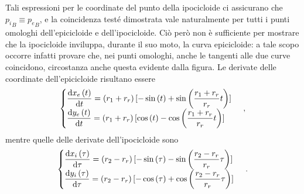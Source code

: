Tali espressioni per le coordinate del punto della ipocicloide
ci assicurano che
${p_i}_{\scriptscriptstyle B}\equiv{p_e}_{\scriptscriptstyle B}$,
e la coincidenza test\'e dimostrata vale naturalmente per tutti i punti
omologhi dell'epicicloide e dell'ipocicloide.
Ci\`o per\`o non \`e sufficiente per mostrare che la ipocicloide inviluppa,
durante il suo moto, la curva epicicloide:
a tale scopo occorre infatti provare che, nei punti omologhi,
anche le tangenti alle due curve coincidono, circostanza anche
questa evidente dalla figura. Le  derivate delle coordinate dell'epicicloide
risultano essere
\begin{equation}
\begin{cases}
\dfrac{{\rm d}{x_e}\left(t\right)}{{\rm d}t} = 
\left(r_1+r_r\right)
[-\sin\left(t\right) +
\sin\left(\dfrac{r_1+r_r}{r_r}t\right)] \\
\dfrac{{\rm d}{y_e}\left(t\right)}{{\rm d}t} = 
\left(r_1+r_r\right)
[\cos\left(t\right) -
\cos\left(\dfrac{r_1+r_r}{r_r}t\right)]
\end{cases}\,,
\label{eq:depicicloide}
\end{equation}
\noindent mentre quelle delle derivate dell'ipocicloide sono
\begin{equation}
\begin{cases}
\dfrac{{\rm d}{x_i}\left(\tau\right)}{{\rm d}\tau} = 
\left(r_2-r_r\right)
[-\sin\left(\tau\right) -
\sin\left(\dfrac{r_2-r_r}{r_r}\tau\right)] \\
\dfrac{{\rm d}{y_i}\left(\tau\right)}{{\rm d}\tau} = 
\left(r_2-r_r\right)
[-\cos\left(\tau\right) +
\cos\left(\dfrac{r_2-r_r}{r_r}\tau\right)]
\end{cases}\,.
\label{eq:dipocicloide}
\end{equation}

